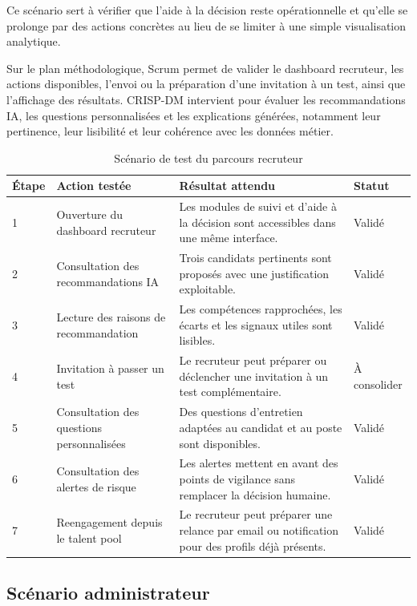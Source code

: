 Ce scénario sert à vérifier que l'aide à la décision reste opérationnelle et qu'elle se prolonge par des actions concrètes au lieu de se limiter à une simple visualisation analytique.

Sur le plan méthodologique, Scrum permet de valider le dashboard recruteur, les actions disponibles, l'envoi ou la préparation d'une invitation à un test, ainsi que l'affichage des résultats. CRISP-DM intervient pour évaluer les recommandations IA, les questions personnalisées et les explications générées, notamment leur pertinence, leur lisibilité et leur cohérence avec les données métier.

\begin{table}[H]
\centering
\small
\renewcommand{\arraystretch}{1.3}
\begin{tabular}{|p{2.3cm}|p{4.2cm}|p{5.2cm}|p{2.3cm}|}
\hline
\rowcolor{headerblue}
\textbf{Étape} & \textbf{Action testée} & \textbf{Résultat attendu} & \textbf{Statut} \\
\hline
1 & Ouverture du dashboard recruteur & Les modules de suivi et d'aide à la décision sont accessibles dans une même interface. & Validé \\
\hline
2 & Consultation des recommandations IA & Trois candidats pertinents sont proposés avec une justification exploitable. & Validé \\
\hline
3 & Lecture des raisons de recommandation & Les compétences rapprochées, les écarts et les signaux utiles sont lisibles. & Validé \\
\hline
4 & Invitation à passer un test & Le recruteur peut préparer ou déclencher une invitation à un test complémentaire. & À consolider \\
\hline
5 & Consultation des questions personnalisées & Des questions d'entretien adaptées au candidat et au poste sont disponibles. & Validé \\
\hline
6 & Consultation des alertes de risque & Les alertes mettent en avant des points de vigilance sans remplacer la décision humaine. & Validé \\
\hline
7 & Reengagement depuis le talent pool & Le recruteur peut préparer une relance par email ou notification pour des profils déjà présents. & Validé \\
\hline
\end{tabular}
\normalsize
\caption{Scénario de test du parcours recruteur}
\end{table}

\subsection{Scénario administrateur}

